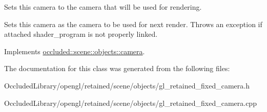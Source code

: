 Sets this camera to the camera that will be used for rendering. 

Sets this camera as the camera to be used for next render. Throws an exception if attached shader\+\_\+program is not properly linked. 

Implements \hyperlink{classoccluded_1_1scene_1_1objects_1_1camera_a4e62fa6846f1009409a7ed87fe03f8ca}{occluded\+::scene\+::objects\+::camera}.



The documentation for this class was generated from the following files\+:\begin{DoxyCompactItemize}
\item 
Occluded\+Library/opengl/retained/scene/objects/gl\+\_\+retained\+\_\+fixed\+\_\+camera.\+h\item 
Occluded\+Library/opengl/retained/scene/objects/gl\+\_\+retained\+\_\+fixed\+\_\+camera.\+cpp\end{DoxyCompactItemize}
